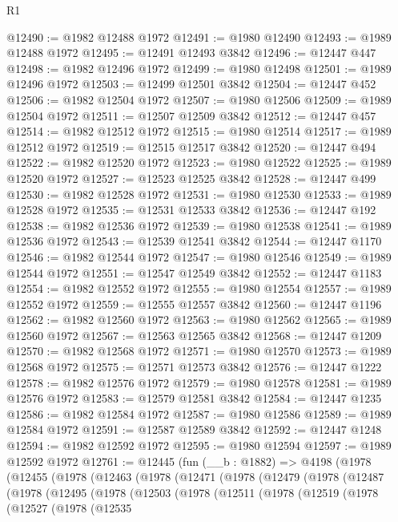 \begin{lexlean}{R1}
\begin{coremodule}
@12490 := @1982 @12488 @1972
@12491 := @1980 @12490
@12493 := @1989 @12488 @1972
@12495 := @12491 @12493 @3842
@12496 := @12447 @447
@12498 := @1982 @12496 @1972
@12499 := @1980 @12498
@12501 := @1989 @12496 @1972
@12503 := @12499 @12501 @3842
@12504 := @12447 @452
@12506 := @1982 @12504 @1972
@12507 := @1980 @12506
@12509 := @1989 @12504 @1972
@12511 := @12507 @12509 @3842
@12512 := @12447 @457
@12514 := @1982 @12512 @1972
@12515 := @1980 @12514
@12517 := @1989 @12512 @1972
@12519 := @12515 @12517 @3842
@12520 := @12447 @494
@12522 := @1982 @12520 @1972
@12523 := @1980 @12522
@12525 := @1989 @12520 @1972
@12527 := @12523 @12525 @3842
@12528 := @12447 @499
@12530 := @1982 @12528 @1972
@12531 := @1980 @12530
@12533 := @1989 @12528 @1972
@12535 := @12531 @12533 @3842
@12536 := @12447 @192
@12538 := @1982 @12536 @1972
@12539 := @1980 @12538
@12541 := @1989 @12536 @1972
@12543 := @12539 @12541 @3842
@12544 := @12447 @1170
@12546 := @1982 @12544 @1972
@12547 := @1980 @12546
@12549 := @1989 @12544 @1972
@12551 := @12547 @12549 @3842
@12552 := @12447 @1183
@12554 := @1982 @12552 @1972
@12555 := @1980 @12554
@12557 := @1989 @12552 @1972
@12559 := @12555 @12557 @3842
@12560 := @12447 @1196
@12562 := @1982 @12560 @1972
@12563 := @1980 @12562
@12565 := @1989 @12560 @1972
@12567 := @12563 @12565 @3842
@12568 := @12447 @1209
@12570 := @1982 @12568 @1972
@12571 := @1980 @12570
@12573 := @1989 @12568 @1972
@12575 := @12571 @12573 @3842
@12576 := @12447 @1222
@12578 := @1982 @12576 @1972
@12579 := @1980 @12578
@12581 := @1989 @12576 @1972
@12583 := @12579 @12581 @3842
@12584 := @12447 @1235
@12586 := @1982 @12584 @1972
@12587 := @1980 @12586
@12589 := @1989 @12584 @1972
@12591 := @12587 @12589 @3842
@12592 := @12447 @1248
@12594 := @1982 @12592 @1972
@12595 := @1980 @12594
@12597 := @1989 @12592 @1972
@12761 := @12445
    (fun (__b : @1882) =>
    @4198
      (@1978
        (@12455
          (@1978
            (@12463
              (@1978
                (@12471
                  (@1978
                    (@12479
                      (@1978
                        (@12487
                          (@1978
                            (@12495
                              (@1978
                                (@12503
                                  (@1978
                                    (@12511
                                      (@1978
                                        (@12519
                                          (@1978
                                            (@12527
                                              (@1978
                                                (@12535

\end{coremodule}
\end{lexlean}
